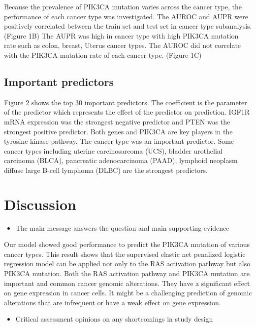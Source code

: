 \documentclass[10pt,letterpaper]{article}
\providecommand{\tightlist}{%
  \setlength{\itemsep}{0pt}\setlength{\parskip}{0pt}}
\begin{document}
Because the prevalence of PIK3CA mutation varies across the cancer type,
the performance of each cancer type was investigated. The AUROC and AUPR
were positively correlated between the train set and test set in cancer
type subanalysis. (Figure 1B) The AUPR was high in cancer type with high
PIK3CA mutation rate such as colon, breast, Uterus cancer types. The
AUROC did not correlate with the PIK3CA mutation rate of each cancer
type. (Figure 1C)

\hypertarget{important-predictors}{%
\subsection{Important predictors}\label{important-predictors}}

Figure 2 shows the top 30 important predictors. The coefficient is the
parameter of the predictor which represents the effect of the predictor
on prediction. IGF1R mRNA expression was the strongest negative
predictor and PTEN was the strongest positive predictor. Both genes and
PIK3CA are key players in the tyrosine kinase pathway. The cancer type
was an important predictor. Some cancer types including uterine
carcinosarcoma (UCS), bladder urothelial carcinoma (BLCA), pancreatic
adenocarcinoma (PAAD), lymphoid neoplasm diffuse large B-cell lymphoma
(DLBC) are the strongest predictors.

\hypertarget{discussion}{%
\section{Discussion}\label{discussion}}

\begin{itemize}
\tightlist
\item
  The main message answers the question and main supporting evidence
\end{itemize}

Our model showed good performance to predict the PIK3CA mutation of
various cancer types. This result shows that the supervised elastic net
penalized logistic regression model can be applied not only to the RAS
activation pathway but also PIK3CA mutation. Both the RAS activation
pathway and PIK3CA mutation are important and common cancer genomic
alterations. They have a significant effect on gene expression in cancer
cells. It might be a challenging prediction of genomic alterations that
are infrequent or have a weak effect on gene expression.

\begin{itemize}
\tightlist
\item
  Critical assessment opinions on any shortcomings in study design
\end{itemize}
\end{document}
